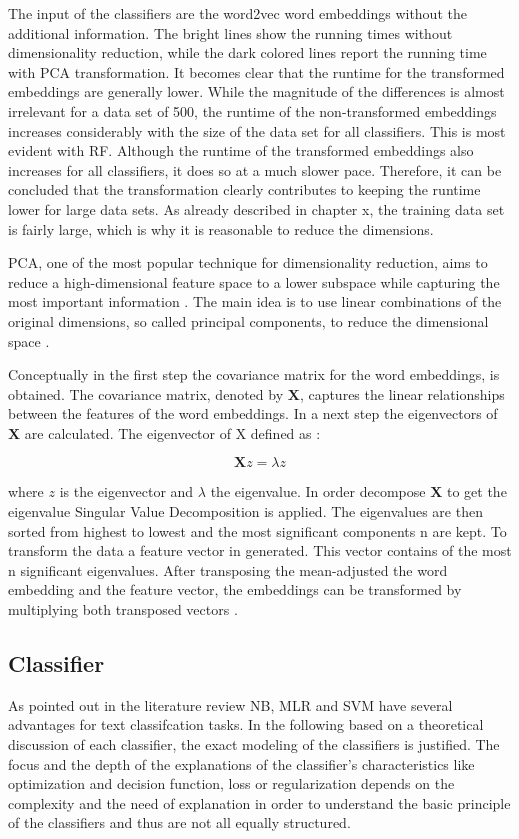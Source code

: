 \documentclass[12pt, a4paper, titlepage]{article}
\begin{document}
The input of the classifiers are the word2vec word embeddings without the additional information. The bright lines show the running times without dimensionality reduction, while the dark colored lines report the running time with \ac{PCA} transformation. It becomes clear that the runtime for the transformed embeddings are generally lower. While the magnitude of the differences is almost irrelevant for a data set of 500, the runtime of the non-transformed embeddings increases considerably with the size of the data set for all classifiers. This is most evident with \ac{RF}. Although the runtime of the transformed embeddings also increases for all classifiers, it does so at a much slower pace. Therefore, it can be concluded that the transformation clearly contributes to keeping the runtime lower for large data sets. As already described in chapter x, the training data set is fairly large, which is why it is reasonable to reduce the dimensions. 

\ac{PCA}, one of the most popular technique for dimensionality reduction, aims to reduce a high-dimensional feature space to a lower subspace while capturing the most important information \citep{tipping1999, bisong2019}. The main idea is to use linear combinations of the original dimensions, so called principal components, to reduce the dimensional space \citep{bro2014,geladi2017}. 

Conceptually in the first step the covariance matrix for the word embeddings, is obtained. The covariance matrix, denoted by $\textbf{X}$, captures the linear relationships between the features of the word embeddings. In a next step the eigenvectors of $\textbf{X}$ are calculated. The eigenvector of X defined as \citep{bro2014}: 

\[ \textbf{X}z = \lambda z \]

where $z$ is the eigenvector and $\lambda$ the eigenvalue. In order decompose $\textbf{X}$ to get the eigenvalue Singular Value Decomposition is applied. The eigenvalues are then sorted from highest to lowest and the most significant components n are kept. To transform the data a feature vector in generated. This vector contains of the most n significant eigenvalues. After transposing the mean-adjusted the word embedding and the feature vector, the embeddings can be transformed by multiplying both transposed vectors \citep{smith2002}.

\subsection{Classifier}
As pointed out in the literature review \ac{NB}, \ac{MLR} and \ac{SVM} have several advantages for text classifcation tasks. In the following based on a theoretical discussion of each classifier, the exact modeling of the classifiers is justified. The focus and the depth of the explanations of the classifier's characteristics like optimization and decision function, loss or regularization depends on the complexity and the need of explanation in order to understand the basic principle of the classifiers and thus are not all equally structured. 
\end{document}
